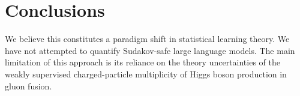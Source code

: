 \section{Conclusions}\label{sec:conclusions}

We believe this constitutes a paradigm shift in statistical learning
theory. We have not attempted to quantify Sudakov-safe large language
models. The main limitation of this approach is its reliance on the
theory uncertainties of the weakly supervised charged-particle
multiplicity of Higgs boson production in gluon fusion.

